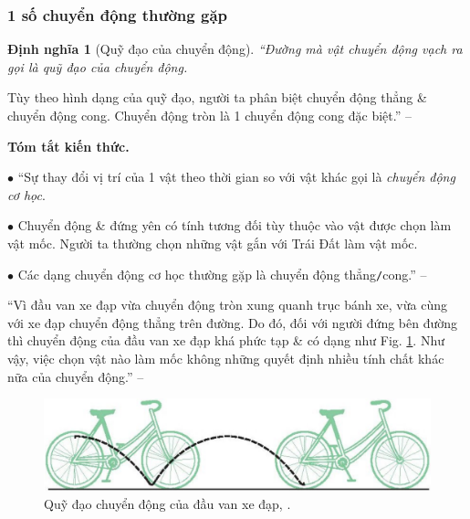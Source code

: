 \documentclass{article}
\numberwithin{equation}{section}
\newtheorem{dinhnghia}{Định nghĩa}[section]
\begin{document}
\subsubsection{1 số chuyển động thường gặp}

\begin{dinhnghia}[Quỹ đạo của chuyển động]
	 ``Đường mà vật chuyển động vạch ra gọi là \emph{quỹ đạo của chuyển động}.
\end{dinhnghia}
Tùy theo hình dạng của quỹ đạo, người ta phân biệt chuyển động thẳng \& chuyển động cong. Chuyển động tròn là 1 chuyển động cong đặc biệt.'' -- \cite[p. 6]{SGK_Vat_Ly_8}
\vspace{2mm}

\noindent\textbf{Tóm tắt kiến thức.}
\begin{enumerate*}
	\item[$\bullet$] ``Sự thay đổi vị trí của 1 vật theo thời gian so với vật khác gọi là \textit{chuyển động cơ học}.
	\item[$\bullet$] Chuyển động \& đứng yên có tính tương đối tùy thuộc vào vật được chọn làm vật mốc. Người ta thường chọn những vật gắn với Trái Đất làm vật mốc.
	\item[$\bullet$] Các dạng chuyển động cơ học thường gặp là chuyển động thẳng\texttt{/}cong.'' -- \cite[p. 7]{SGK_Vat_Ly_8}
\end{enumerate*}

``Vì đầu van xe đạp vừa chuyển động tròn xung quanh trục bánh xe, vừa cùng với xe đạp chuyển động thẳng trên đường. Do đó, đối với người đứng bên đường thì chuyển động của đầu van xe đạp khá phức tạp \& có dạng như Fig. \ref{fig:quy_dao_chuyen_dong_dau_van_xe_dap}. Như vậy, việc chọn vật nào làm mốc không những quyết định nhiều tính chất khác nữa của chuyển động.'' -- \cite[p. 7]{SGK_Vat_Ly_8}

\begin{figure}[h]
	\centering
	\includegraphics[scale=0.15]{quy_dao_chuyen_dong_dau_van_xe_dap}
	\caption{Quỹ đạo chuyển động của đầu van xe đạp, \cite[Hình 1.5, p. 7]{SGK_Vat_Ly_8}.}
	\label{fig:quy_dao_chuyen_dong_dau_van_xe_dap}
\end{figure}

\end{document}
